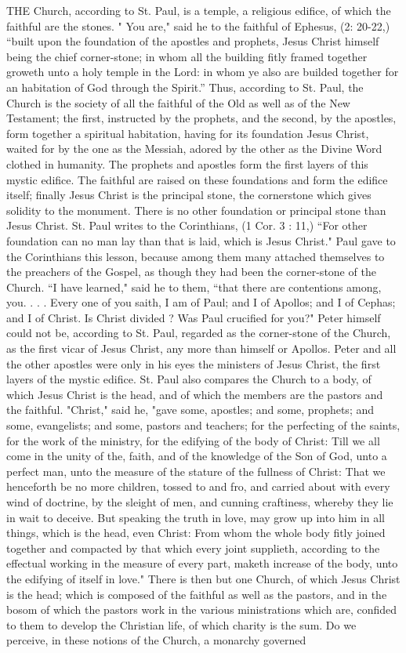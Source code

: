 THE Church, according to St. Paul, is a temple, a religious edifice, of which the faithful are the stones. " You are," said he to the faithful of Ephesus, (2: 20-22,) “built upon the foundation of the apostles and prophets, Jesus Christ himself being the chief corner-stone; in whom all the building fitly framed together groweth unto a holy temple in the Lord: in whom ye also are builded together for an habitation of God through the Spirit.” Thus, according to St. Paul, the Church is the society of all the faithful of the Old as well as of the New Testament; the first, instructed by the prophets, and the second, by the apostles, form together a spiritual habitation, having for its foundation Jesus Christ, waited for by the one as the Messiah, adored by the other as the Divine Word clothed in humanity. The prophets and apostles form the first layers of this mystic edifice. The faithful are raised on these foundations and form the edifice itself; finally Jesus Christ is the principal stone, the cornerstone which gives solidity to the monument. There is no other foundation or principal stone than Jesus Christ. St. Paul writes to the Corinthians, (1 Cor. 3 : 11,) “For other foundation can no man lay than that is laid, which is Jesus Christ." Paul gave to the Corinthians this lesson, because among them many attached themselves to the preachers of the Gospel, as though they had been the corner-stone of the Church. “I have learned," said he to them, “that there are contentions among, you. . . . Every one of you saith, I am of Paul; and I of Apollos; and I of Cephas; and I of Christ. Is Christ divided ? Was Paul crucified for you?" Peter himself could not be, according to St. Paul, regarded as the corner-stone of the Church, as the first vicar of Jesus Christ, any more than himself or Apollos. Peter and all the other apostles were only in his eyes the ministers of Jesus Christ, the first layers of the mystic edifice. St. Paul also compares the Church to a body, of which Jesus Christ is the head, and of which the members are the pastors and the faithful. "Christ," said he, "gave some, apostles; and some, prophets; and some, evangelists; and some, pastors and teachers; for the perfecting of the saints, for the work of the ministry, for the edifying of the body of Christ: Till we all come in the unity of the, faith, and of the knowledge of the Son of God, unto a perfect man, unto the measure of the stature of the fullness of Christ: That we henceforth be no more children, tossed to and fro, and carried about with every wind of doctrine, by the sleight of men, and cunning craftiness, whereby they lie in wait to deceive. But speaking the truth in love, may grow up into him in all things, which is the head, even Christ: From whom the whole body fitly joined together and compacted by that which every joint supplieth, according to the effectual working in the measure of every part, maketh increase of the body, unto the edifying of itself in love." There is then but one Church, of which Jesus Christ is the head; which is composed of the faithful as well as the pastors, and in the bosom of which the pastors work in the various ministrations which are, confided to them to develop the Christian life, of which charity is the sum. Do we perceive, in these notions of the Church, a monarchy governed 